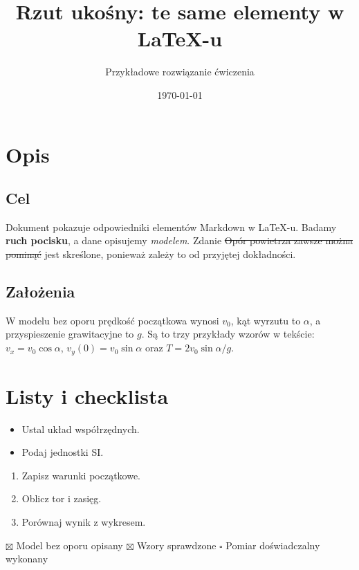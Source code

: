 \documentclass[11pt,a4paper]{article}
\title{Rzut ukośny: te same elementy w LaTeX-u}
\author{Przykładowe rozwiązanie ćwiczenia}
\date{\today}
\begin{document}
\maketitle
\tableofcontents

\section{Opis}
\subsection{Cel}
Dokument pokazuje odpowiedniki elementów Markdown w LaTeX-u.
Badamy \textbf{ruch pocisku}, a dane opisujemy \textit{modelem}.
Zdanie \sout{Opór powietrza zawsze można pominąć} jest skreślone,
ponieważ zależy to od przyjętej dokładności.

\subsection{Założenia}
W modelu bez oporu prędkość początkowa wynosi $v_0$,
kąt wyrzutu to $\alpha$, a przyspieszenie grawitacyjne to $g$.
Są to trzy przykłady wzorów w tekście:
$v_x=v_0\cos\alpha$, $v_y(0)=v_0\sin\alpha$ oraz
$T=2v_0\sin\alpha/g$.

\section{Listy i checklista}
\begin{itemize}
  \item Ustal układ współrzędnych.
  \item Podaj jednostki SI.
\end{itemize}
\begin{enumerate}
  \item Zapisz warunki początkowe.
  \item Oblicz tor i zasięg.
  \item Porównaj wynik z wykresem.
\end{enumerate}
\noindent$\boxtimes$ Model bez oporu opisany \qquad
$\boxtimes$ Wzory sprawdzone \qquad
$\square$ Pomiar doświadczalny wykonany
\end{document}
